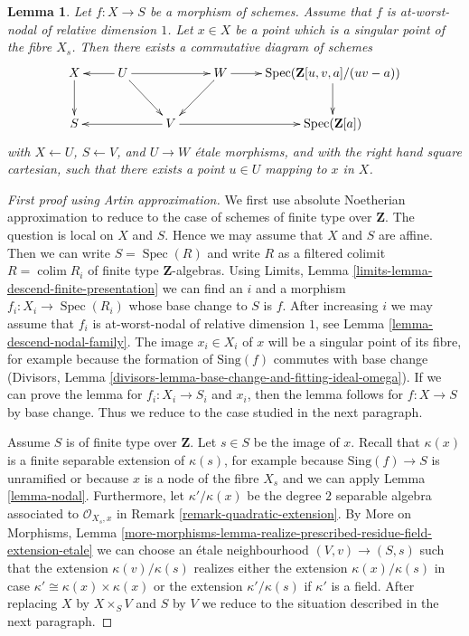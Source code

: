 \documentclass{stacks-project}
\theoremstyle{plain}
\newtheorem{lemma}[subsection]{Lemma}
\theoremstyle{definition}
\theoremstyle{remark}
\numberwithin{equation}{subsection}
\def\colim{\mathop{\mathrm{colim}}\nolimits}
\def\Spec{\mathop{\mathrm{Spec}}}
\begin{document}
\begin{lemma}
\label{lemma-etale-local-structure-nodal-family}
Let $f : X \to S$ be a morphism of schemes. Assume that
$f$ is at-worst-nodal of relative dimension $1$. Let
$x \in X$ be a point which is a singular point of the
fibre $X_s$. Then there exists a commutative diagram of schemes
$$
\xymatrix{
X \ar[d] &
U \ar[rr] \ar[l] \ar[rd] & &
W \ar[r] \ar[ld] &
\Spec(\mathbf{Z}[u, v, a]/(uv - a)) \ar[d] \\
S & &
V \ar[ll] \ar[rr] & & \Spec(\mathbf{Z}[a])
}
$$
with $X \leftarrow U$, $S \leftarrow V$, and $U \to W$ \'etale morphisms,
and with the right hand square cartesian, such that there exists
a point $u \in U$ mapping to $x$ in $X$.
\end{lemma}

\begin{proof}[First proof using Artin approximation]
We first use absolute Noetherian approximation to reduce to the
case of schemes of finite type over $\mathbf{Z}$.
The question is local on $X$ and $S$. Hence we may assume that
$X$ and $S$ are affine. Then we can write $S = \Spec(R)$
and write $R$ as a filtered colimit $R = \colim R_i$
of finite type $\mathbf{Z}$-algebras.
Using Limits, Lemma \ref{limits-lemma-descend-finite-presentation}
we can find an $i$ and a morphism $f_i : X_i \to \Spec(R_i)$ whose base
change to $S$ is $f$. After increasing $i$ we may assume that $f_i$
is at-worst-nodal of relative dimension $1$, see
Lemma \ref{lemma-descend-nodal-family}.
The image $x_i \in X_i$ of $x$ will be a singular
point of its fibre, for example because the formation of
$\text{Sing}(f)$ commutes with base change (Divisors, Lemma
\ref{divisors-lemma-base-change-and-fitting-ideal-omega}).
If we can prove the lemma for $f_i : X_i \to S_i$ and
$x_i$, then the lemma follows for $f : X \to S$ by base
change. Thus we reduce to the case studied in the next
paragraph.

\medskip\noindent
Assume $S$ is of finite type over $\mathbf{Z}$. Let $s \in S$ be the
image of $x$. Recall that $\kappa(x)$ is a finite separable extension
of $\kappa(s)$, for example because $\text{Sing}(f) \to S$
is unramified or because $x$ is a node of the fibre $X_s$
and we can apply Lemma \ref{lemma-nodal}.
Furthermore, let $\kappa'/\kappa(x)$ be the
degree $2$ separable algebra associated to $\mathcal{O}_{X_s, x}$ in
Remark \ref{remark-quadratic-extension}.
By More on Morphisms, Lemma
\ref{more-morphisms-lemma-realize-prescribed-residue-field-extension-etale}
we can choose an \'etale neighbourhood $(V, v) \to (S, s)$
such that the extension $\kappa(v)/\kappa(s)$ realizes either
the extension $\kappa(x)/\kappa(s)$ in case
$\kappa' \cong \kappa(x) \times \kappa(x)$ or
the extension $\kappa'/\kappa(s)$ if $\kappa'$ is a field.
After replacing $X$ by $X \times_S V$ and $S$ by $V$
we reduce to the situation described in the next paragraph.


\end{proof}
\end{document}
